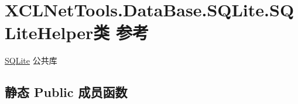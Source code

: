 \hypertarget{class_x_c_l_net_tools_1_1_data_base_1_1_s_q_lite_1_1_s_q_lite_helper}{}\section{X\+C\+L\+Net\+Tools.\+Data\+Base.\+S\+Q\+Lite.\+S\+Q\+Lite\+Helper类 参考}
\label{class_x_c_l_net_tools_1_1_data_base_1_1_s_q_lite_1_1_s_q_lite_helper}


\hyperlink{namespace_x_c_l_net_tools_1_1_data_base_1_1_s_q_lite}{S\+Q\+Lite} 公共库  


\subsection*{静态 Public 成员函数}
